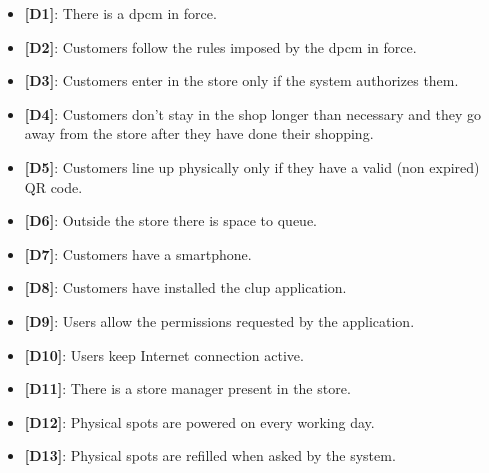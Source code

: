 \begin{itemize}

	\item \textbf{{[D1]}}: There is a \gls{dpcm} in force.
	\item \textbf{{[D2]}}: Customers follow the rules imposed by the \gls{dpcm} in force.
	\item \textbf{{[D3]}}: Customers enter in the store only if the system authorizes them.
	\item \textbf{{[D4]}}: Customers don't stay in the shop longer than necessary and they go away from the store after they have done their shopping.
	\item \textbf{{[D5]}}: Customers line up physically only if they have a valid (non expired) QR code.
	\item \textbf{{[D6]}}: Outside the store there is space to queue.
	\item \textbf{{[D7]}}: Customers have a smartphone.
	\item \textbf{{[D8]}}: Customers have installed the \gls{clup} application.
	\item \textbf{{[D9]}}: Users allow the permissions requested by the application.
	\item \textbf{{[D10]}}: Users keep Internet connection active.
	\item \textbf{{[D11]}}: There is a store manager present in the store.
	\item \textbf{{[D12]}}: Physical spots are powered on every working day.
	\item \textbf{{[D13]}}: Physical spots are refilled when asked by the system.

\end{itemize}